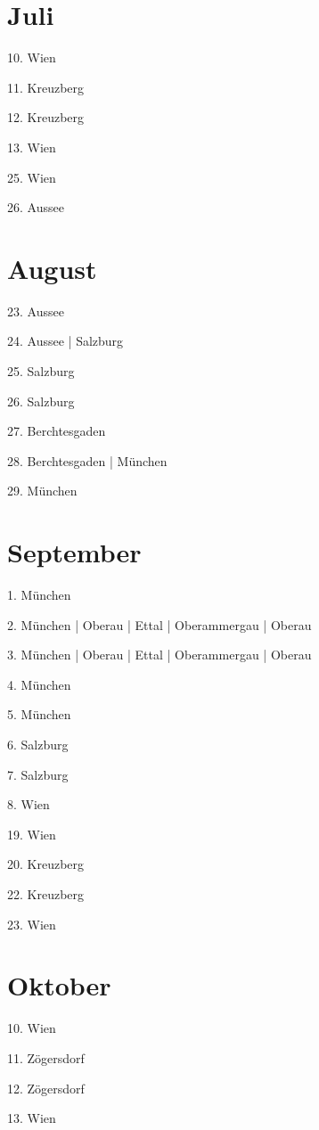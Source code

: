 \documentclass[twoside=false,titlepage=false,open=any, parskip=never, fontsize=10pt, headings=small, chapterprefix=false, appendixprefix=false, DIV=15]{scrbook}
\begin{document}
\begin{multicols}{3}
            \section*{Juli}
            10. Wien\par
            11. Kreuzberg\par
            12. Kreuzberg\par
            13. Wien\par
            25. Wien\par
            26. Aussee\par
            \section*{August}
            23. Aussee\par
            24. Aussee | Salzburg\par
            25. Salzburg\par
            26. Salzburg\par
            27. Berchtesgaden\par
            28. Berchtesgaden | München\par
            29. München\par
            \section*{September}
            1. München\par
            2. München | Oberau | Ettal | Oberammergau | Oberau\par
            3. München | Oberau | Ettal | Oberammergau | Oberau\par
            4. München\par
            5. München\par
            6. Salzburg\par
            7. Salzburg\par
            8. Wien\par
            19. Wien\par
            20. Kreuzberg\par
            22. Kreuzberg\par
            23. Wien\par
            \section*{Oktober}
            10. Wien\par
            11. Zögersdorf\par
            12. Zögersdorf\par
            13. Wien\par

\end{multicols}
\end{document}
